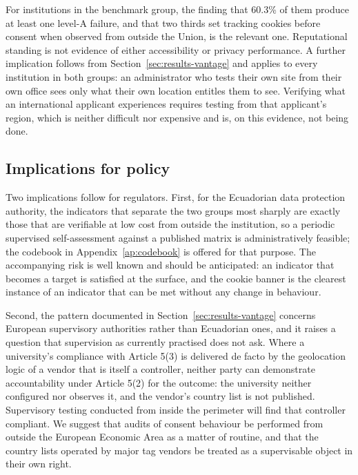 \documentclass[]{interact}
\begin{document}
For institutions in the benchmark group, the finding that 60.3\% of them produce at least one level-A failure, and that two thirds set tracking cookies before consent when observed from outside the Union, is the relevant one. Reputational standing is not evidence of either accessibility or privacy performance. A further implication follows from Section~\ref{sec:results-vantage} and applies to every institution in both groups: an administrator who tests their own site from their own office sees only what their own location entitles them to see. Verifying what an international applicant experiences requires testing from that applicant's region, which is neither difficult nor expensive and is, on this evidence, not being done.

\subsection{Implications for policy}\label{sec:discussion-policy}

Two implications follow for regulators. First, for the Ecuadorian data protection authority, the indicators that separate the two groups most sharply are exactly those that are verifiable at low cost from outside the institution, so a periodic supervised self-assessment against a published matrix is administratively feasible; the codebook in Appendix~\ref{ap:codebook} is offered for that purpose. The accompanying risk is well known and should be anticipated: an indicator that becomes a target is satisfied at the surface, and the cookie banner is the clearest instance of an indicator that can be met without any change in behaviour.

Second, the pattern documented in Section~\ref{sec:results-vantage} concerns European supervisory authorities rather than Ecuadorian ones, and it raises a question that supervision as currently practised does not ask. Where a university's compliance with Article 5(3) is delivered de facto by the geolocation logic of a vendor that is itself a controller, neither party can demonstrate accountability under Article 5(2) for the outcome: the university neither configured nor observes it, and the vendor's country list is not published. Supervisory testing conducted from inside the perimeter will find that controller compliant. We suggest that audits of consent behaviour be performed from outside the European Economic Area as a matter of routine, and that the country lists operated by major tag vendors be treated as a supervisable object in their own right.
\end{document}
